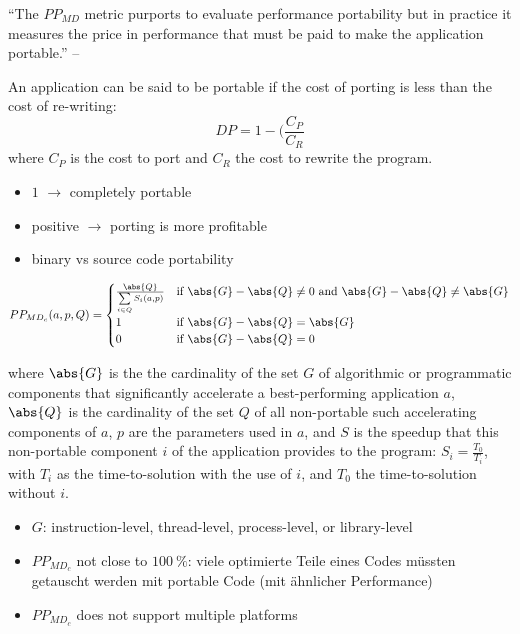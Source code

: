 \newpage
\cite{sedova_high-performance_2018}

\enquote{The $PP_{MD}$ metric purports to evaluate performance portability but in practice it measures the price in performance that must be paid to make the application portable.} -- \cite{marowka_comparison_2023}

\begin{definition}
An application can be said to be portable if the cost of porting is less than the cost of re-writing:
$$DP = 1 - (\frac{C_P}{C_R}$$
where $C_P$ is the cost to port and $C_R$ the cost to rewrite the program. 
\end{definition}

\begin{itemize}
    \item $1$ $\rightarrow$ completely portable
    \item positive $\rightarrow$ porting is more profitable
    \item binary vs source code portability
\end{itemize}

\begin{definition}

$$PP_{MD_c}(a, p, Q) = 
    \begin{cases}
        \frac{\abs{Q}}{\sum\limits_{i \in Q} S_i(a, p)} & \text{if }\abs{G} - \abs{Q} \neq 0\text{ and }\abs{G} - \abs{Q} \neq \abs{G} \\
        1  & \text{if }\abs{G} - \abs{Q} = \abs{G}\\
        0  & \text{if }\abs{G} - \abs{Q} = 0
    \end{cases}
$$

where $\abs{G}$ is the the cardinality of the set $G$ of algorithmic or programmatic components that significantly accelerate a best-performing application $a$, $\abs{Q}$ is the cardinality of the set $Q$ of all non-portable such accelerating components of $a$, $p$ are the parameters used in $a$, and $S$ is the speedup that this non-portable component $i$ of the application provides to the program: $S_i = \frac{T_0}{T_i}$, with $T_i$ as the time-to-solution with the use of $i$, and $T_0$ the time-to-solution without $i$.
\end{definition}

\begin{itemize}
    \item $G$: instruction-level, thread-level, process-level, or library-level
    \item $PP_{MD_c}$ not close to $\SI{100}{\percent}$: viele optimierte Teile eines Codes müssten getauscht werden mit portable Code (mit ähnlicher Performance)
    \item $PP_{MD_c}$ does not support multiple platforms
\end{itemize}

